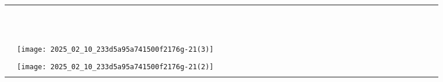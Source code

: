 \documentclass[10pt]{article}
\begin{document}
\begin{center}
\begin{tabular}{|c|c|c|c|c|c|c|c|c|c|c|c|c|c|c|c|c|c|c|c|c|c|c|c|c|c|c|c|c|}
\hline
 &  &  &  &  &  &  &  &  &  &  &  &  &  &  &  &  &  &  &  &  &  &  &  &  &  &  &  &  \\
\hline
 &  &  &  &  &  &  &  &  &  &  &  &  &  &  &  &  &  &  &  &  &  &  &  &  &  &  &  &  \\
\hline
 &  &  &  &  &  &  &  &  &  &  &  &  &  &  &  &  &  &  &  &  &  &  &  &  &  &  &  &  \\
\hline
 &  &  &  &  &  &  &  &  &  &  &  &  &  &  &  &  &  &  &  &  &  &  &  &  &  &  &  &  \\
\hline
 &  &  &  &  &  &  &  &  &  &  &  &  &  &  &  &  &  &  &  &  &  &  &  &  &  &  &  &  \\
\hline
 &  &  &  &  &  &  &  &  &  &  &  &  &  &  &  &  &  &  &  &  &  &  &  &  &  &  &  &  \\
\hline
 &  &  &  &  &  &  &  &  &  &  &  &  &  &  &  &  &  &  &  &  &  &  &  &  &  &  &  &  \\
\hline
 &  &  &  &  &  &  &  &  &  &  &  &  &  &  &  &  &  &  &  &  &  &  &  &  &  &  &  &  \\
\hline
 &  &  &  &  &  &  &  &  &  &  &  &  &  &  &  &  &  &  &  &  &  &  &  &  &  &  &  &  \\
\hline
 &  &  &  &  &  &  &  &  &  &  &  &  &  &  &  &  &  &  &  &  &  &  &  &  &  &  &  &  \\
\hline
 &  &  &  &  &  &  &  &  &  &  &  &  &  &  &  &  &  &  &  &  &  &  &  &  &  &  &  &  \\
\hline
 &  &  &  &  &  &  &  &  &  &  &  &  &  &  &  &  &  &  &  &  &  &  &  &  &  &  &  &  \\
\hline
 &  &  &  &  &  &  &  &  &  &  &  &  &  &  &  &  &  &  &  &  &  &  &  &  &  &  &  &  \\
\hline
 & \texttt{[image: 2025\_02\_10\_233d5a95a741500f2176g-21(3)]}
 &  &  &  &  &  &  &  &  &  &  &  &  &  &  &  &  &  &  &  &  &  &  &  &  &  &  &  \\
\hline
 &  &  &  &  &  &  &  &  &  &  &  &  &  &  &  &  &  &  &  &  &  &  &  &  &  &  &  &  \\
\hline
 & \texttt{[image: 2025\_02\_10\_233d5a95a741500f2176g-21(2)]}
 &  &  &  &  &  &  &  &  &  &  &  &  &  &  &  &  &  &  &  &  &  &  &  &  &  &  &  \\
\hline
 &  &  &  &  &  &  &  &  &  &  &  &  &  &  &  &  &  &  &  &  &  &  &  &  &  &  &  &  \\

\end{tabular}
\end{center}
\end{document}
